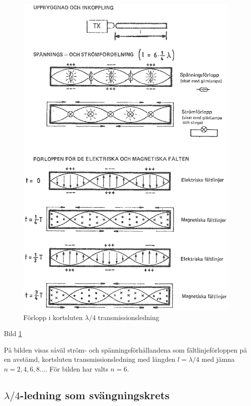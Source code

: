\begin{figure}
  \includegraphics[width=\textwidth]{images/cropped_pdfs/bild_2_6-34.pdf}
  \caption{Förlopp i kortsluten $\lambda/4$ transmissionsledning}
  \label{fig:bildII6-34}
\end{figure}

Bild \ref{fig:bildII6-34}

På bilden visas såväl ström- och spänningsförhållandena som
fältlinjeförloppen på en avstämd, kortsluten transmissionsledning med
längden \(l = \lambda/4\) med jämna \(n = 2, 4, 6, 8 \dots\). För
bilden har valts \(n = 6\).

\subsection{$\lambda/4$-ledning som svängningskrets}

